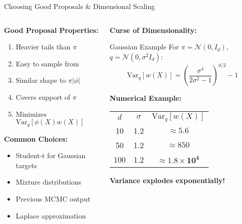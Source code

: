 \begin{frame}{Choosing Good Proposals \& Dimensional Scaling}
	\begin{columns}
		\begin{column}{0.5\textwidth}
			\textbf{Good Proposal Properties:}
			\begin{enumerate}
				\item Heavier tails than $\pi$
				\item Easy to sample from
				\item Similar shape to $\pi|\phi|$
				\item Covers support of $\pi$
				\item Minimizes $\text{Var}_q[\phi(X)w(X)]$
			\end{enumerate}

			\vspace{0.3cm}
			\textbf{Common Choices:}
			\begin{itemize}
				\item Student-t for Gaussian targets
				\item Mixture distributions
				\item Previous MCMC output
				\item Laplace approximation
			\end{itemize}
		\end{column}

		\begin{column}{0.5\textwidth}
			\textbf{Curse of Dimensionality:}
			\begin{block}{Gaussian Example}
				For $\pi = \mathcal{N}(0,I_d)$, $q = \mathcal{N}(0,\sigma^2 I_d)$:
				$$\text{Var}_q[w(X)] = \left(\frac{\sigma^4}{2\sigma^2-1}\right)^{d/2} - 1$$
			\end{block}

			\textbf{Numerical Example:}
			\begin{center}
				\begin{tabular}{ccc}
					$d$ & $\sigma$ & $\text{Var}_q[w(X)]$               \\
					10  & 1.2      & $\approx 5.6$                      \\
					50  & 1.2      & $\approx 850$                      \\
					100 & 1.2      & $\approx \mathbf{1.8 \times 10^4}$ \\
				\end{tabular}
			\end{center}

			\textbf{Variance explodes exponentially!}
		\end{column}
	\end{columns}
\end{frame}

